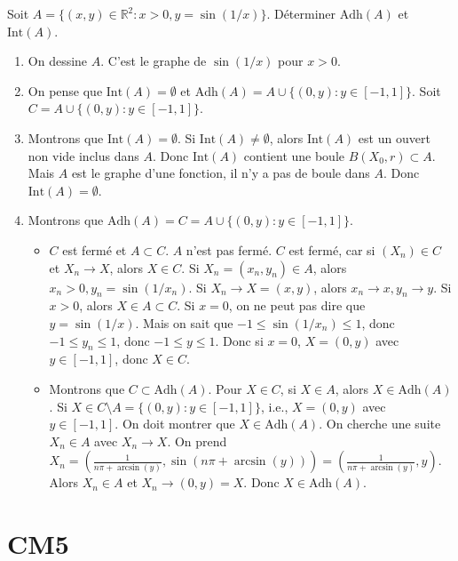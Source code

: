 \documentclass[oneside]{book}
\begin{document}
\begin{example}
Soit $A = \{(x,y) \in \mathbb{R}^2 : x > 0, y = \sin(1/x)\}$. Déterminer $\mathrm{Adh}(A)$ et $\mathrm{Int}(A)$.
\end{example}

\begin{solution}
\begin{enumerate}
    \item On dessine $A$. C'est le graphe de $\sin(1/x)$ pour $x > 0$.
    \item On pense que $\mathrm{Int}(A) = \emptyset$ et $\mathrm{Adh}(A) = A \cup \{(0,y) : y \in [-1, 1]\}$. Soit $C = A \cup \{(0,y) : y \in [-1, 1]\}$.
    \item Montrons que $\mathrm{Int}(A) = \emptyset$. Si $\mathrm{Int}(A) \neq \emptyset$, alors $\mathrm{Int}(A)$ est un ouvert non vide inclus dans $A$. Donc $\mathrm{Int}(A)$ contient une boule $B(X_0, r) \subset A$. Mais $A$ est le graphe d'une fonction, il n'y a pas de boule dans $A$. Donc $\mathrm{Int}(A) = \emptyset$.
    \item Montrons que $\mathrm{Adh}(A) = C = A \cup \{(0,y) : y \in [-1, 1]\}$.
    \begin{itemize}
        \item $C$ est fermé et $A \subset C$. $A$ n'est pas fermé. $C$ est fermé, car si $(X_n) \in C$ et $X_n \to X$, alors $X \in C$. Si $X_n = (x_n, y_n) \in A$, alors $x_n > 0, y_n = \sin(1/x_n)$. Si $X_n \to X = (x, y)$, alors $x_n \to x, y_n \to y$. Si $x > 0$, alors $X \in A \subset C$. Si $x = 0$, on ne peut pas dire que $y = \sin(1/x)$. Mais on sait que $-1 \leq \sin(1/x_n) \leq 1$, donc $-1 \leq y_n \leq 1$, donc $-1 \leq y \leq 1$. Donc si $x = 0$, $X = (0, y)$ avec $y \in [-1, 1]$, donc $X \in C$.
        \item Montrons que $C \subset \mathrm{Adh}(A)$. Pour $X \in C$, si $X \in A$, alors $X \in \mathrm{Adh}(A)$. Si $X \in C \setminus A = \{(0,y) : y \in [-1, 1]\}$, i.e., $X = (0, y)$ avec $y \in [-1, 1]$. On doit montrer que $X \in \mathrm{Adh}(A)$. On cherche une suite $X_n \in A$ avec $X_n \to X$. On prend $X_n = (\frac{1}{n \pi + \arcsin(y)}, \sin(n \pi + \arcsin(y))) = (\frac{1}{n \pi + \arcsin(y)}, y)$. Alors $X_n \in A$ et $X_n \to (0, y) = X$. Donc $X \in \mathrm{Adh}(A)$.
    \end{itemize}
\end{enumerate}
\end{solution}\chapter{CM5}
\sloppy
\end{document}
